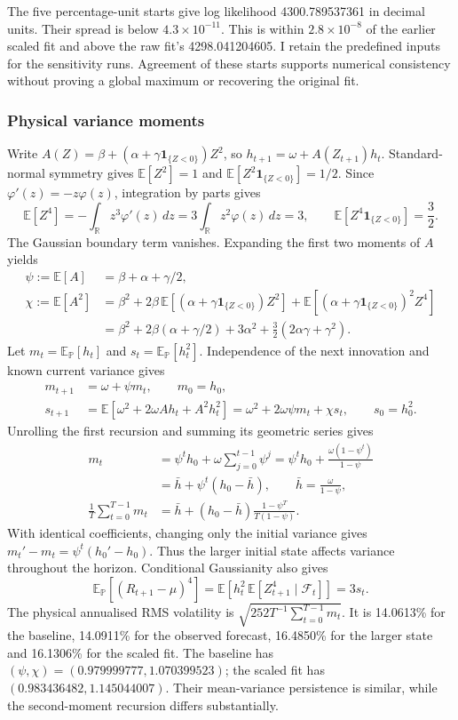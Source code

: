 \documentclass[11pt,a4paper]{article}
\newcommand{\Pp}{\mathbb P}
\newcommand{\F}{\mathcal F}
\theoremstyle{remark}
\begin{document}
The five percentage-unit starts give log likelihood 4300.789537361 in decimal units. Their spread is below $4.3\times10^{-11}$. This is within $2.8\times10^{-8}$ of the earlier scaled fit and above the raw fit's 4298.041204605. I retain the predefined inputs for the sensitivity runs. Agreement of these starts supports numerical consistency without proving a global maximum or recovering the original fit.

\subsubsection{Physical variance moments}
Write $A(Z)=\beta+(\alpha+\gamma\mathbf1_{\{Z<0\}})Z^2$, so $h_{t+1}=\omega+A(Z_{t+1})h_t$. Standard-normal symmetry gives $\mathbb E[Z^2]=1$ and $\mathbb E[Z^2\mathbf1_{\{Z<0\}}]=1/2$. Since $\varphi'(z)=-z\varphi(z)$, integration by parts gives
\[
 \mathbb E[Z^4]=-\int_{\mathbb R}z^3\varphi'(z)\,dz
 =3\int_{\mathbb R}z^2\varphi(z)\,dz=3,
 \qquad \mathbb E[Z^4\mathbf1_{\{Z<0\}}]=\frac32.
\]
The Gaussian boundary term vanishes. Expanding the first two moments of $A$ yields
\begin{align}
 \psi:=\mathbb E[A]&=\beta+\alpha+\gamma/2,\nonumber\\
 \chi:=\mathbb E[A^2]
 &=\beta^2+2\beta\,\mathbb E[(\alpha+\gamma\mathbf1_{\{Z<0\}})Z^2]
   +\mathbb E[(\alpha+\gamma\mathbf1_{\{Z<0\}})^2Z^4]\nonumber\\
 &=\beta^2+2\beta(\alpha+\gamma/2)
   +3\alpha^2+\tfrac32(2\alpha\gamma+\gamma^2).
\end{align}
Let $m_t=\mathbb E_{\Pp}[h_t]$ and $s_t=\mathbb E_{\Pp}[h_t^2]$. Independence of the next innovation and known current variance gives
\begin{align}
 m_{t+1}&=\omega+\psi m_t,\qquad m_0=h_0,\nonumber\\
 s_{t+1}&=\mathbb E[\omega^2+2\omega A h_t+A^2h_t^2]
          =\omega^2+2\omega\psi m_t+\chi s_t,
          \qquad s_0=h_0^2.
\end{align}
Unrolling the first recursion and summing its geometric series gives
\begin{align}
 m_t&=\psi^t h_0+\omega\sum_{j=0}^{t-1}\psi^j
     =\psi^t h_0+\frac{\omega(1-\psi^t)}{1-\psi}\nonumber\\
 &=\bar h+\psi^t(h_0-\bar h),\qquad \bar h=\frac{\omega}{1-\psi},\nonumber\\
 \frac1T\sum_{t=0}^{T-1}m_t
 &=\bar h+(h_0-\bar h)\frac{1-\psi^T}{T(1-\psi)}.
\end{align}
With identical coefficients, changing only the initial variance gives $m_t'-m_t=\psi^t(h_0'-h_0)$. Thus the larger initial state affects variance throughout the horizon. Conditional Gaussianity also gives
\[
 \mathbb E_{\Pp}[(R_{t+1}-\mu)^4]
 =\mathbb E[h_t^2\,\mathbb E[Z_{t+1}^4\mid\F_t]]=3s_t.
\]
The physical annualised RMS volatility is $\sqrt{252T^{-1}\sum_{t=0}^{T-1}m_t}$. It is 14.0613\% for the baseline, 14.0911\% for the observed forecast, 16.4850\% for the larger state and 16.1306\% for the scaled fit. The baseline has $(\psi,\chi)=(0.979999777,1.070399523)$; the scaled fit has $(0.983436482,1.145044007)$. Their mean-variance persistence is similar, while the second-moment recursion differs substantially.
\end{document}

